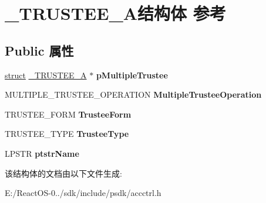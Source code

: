 \hypertarget{struct___t_r_u_s_t_e_e___a}{}\section{\+\_\+\+T\+R\+U\+S\+T\+E\+E\+\_\+\+A结构体 参考}
\label{struct___t_r_u_s_t_e_e___a}
\subsection*{Public 属性}
\begin{DoxyCompactItemize}
\item 
\mbox{\label{struct___t_r_u_s_t_e_e___a_ad69db234fa23192aec221dfe77373264}} 
\hyperlink{interfacestruct}{struct} \hyperlink{struct___t_r_u_s_t_e_e___a}{\+\_\+\+T\+R\+U\+S\+T\+E\+E\+\_\+A} $\ast$ {\bfseries p\+Multiple\+Trustee}
\item 
\mbox{\label{struct___t_r_u_s_t_e_e___a_a74eb3e7aaf8b78894a2990c1676315c6}} 
M\+U\+L\+T\+I\+P\+L\+E\+\_\+\+T\+R\+U\+S\+T\+E\+E\+\_\+\+O\+P\+E\+R\+A\+T\+I\+ON {\bfseries Multiple\+Trustee\+Operation}
\item 
\mbox{\label{struct___t_r_u_s_t_e_e___a_ad2d3c489ab08ea758fb83cc8ae5d873a}} 
T\+R\+U\+S\+T\+E\+E\+\_\+\+F\+O\+RM {\bfseries Trustee\+Form}
\item 
\mbox{\label{struct___t_r_u_s_t_e_e___a_a8a28bb0b427e526152e6ac7485b66f13}} 
T\+R\+U\+S\+T\+E\+E\+\_\+\+T\+Y\+PE {\bfseries Trustee\+Type}
\item 
\mbox{\label{struct___t_r_u_s_t_e_e___a_ae8f4688cd941dbb5ea76967a5d6e3dbe}} 
L\+P\+S\+TR {\bfseries ptstr\+Name}
\end{DoxyCompactItemize}


该结构体的文档由以下文件生成\+:\begin{DoxyCompactItemize}
\item 
E\+:/\+React\+O\+S-\/0../sdk/include/psdk/accctrl.\+h\end{DoxyCompactItemize}
